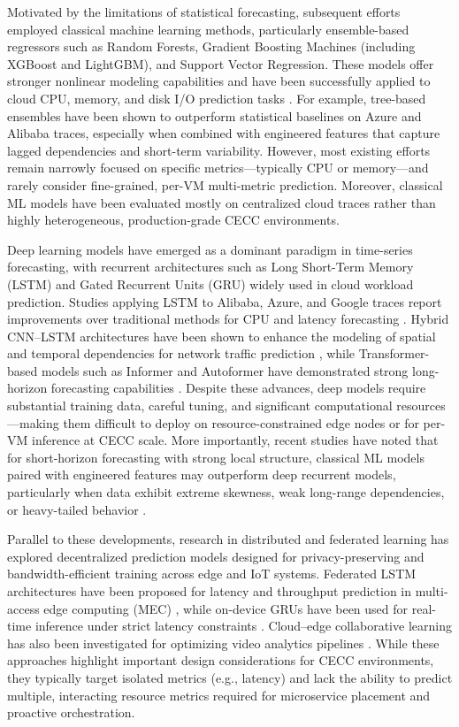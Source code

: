 \documentclass[a4paper,fleqn]{cas-dc}
\begin{document}
Motivated by the limitations of statistical forecasting, subsequent efforts employed classical machine learning methods, particularly ensemble-based regressors such as Random Forests, Gradient Boosting Machines (including XGBoost and LightGBM), and Support Vector Regression. These models offer stronger nonlinear modeling capabilities and have been successfully applied to cloud CPU, memory, and disk I/O prediction tasks \cite{b7,b8,b9}. For example, tree-based ensembles have been shown to outperform statistical baselines on Azure and Alibaba traces, especially when combined with engineered features that capture lagged dependencies and short-term variability. However, most existing efforts remain narrowly focused on specific metrics---typically CPU or memory---and rarely consider fine-grained, per-VM multi-metric prediction. Moreover, classical ML models have been evaluated mostly on centralized cloud traces rather than highly heterogeneous, production-grade CECC environments.

Deep learning models have emerged as a dominant paradigm in time-series forecasting, with recurrent architectures such as Long Short-Term Memory (LSTM) and Gated Recurrent Units (GRU) widely used in cloud workload prediction. Studies applying LSTM to Alibaba, Azure, and Google traces report improvements over traditional methods for CPU and latency forecasting \cite{b11,b12}. Hybrid CNN--LSTM architectures have been shown to enhance the modeling of spatial and temporal dependencies for network traffic prediction \cite{b14}, while Transformer-based models such as Informer and Autoformer have demonstrated strong long-horizon forecasting capabilities \cite{b15,b16}. Despite these advances, deep models require substantial training data, careful tuning, and significant computational resources---making them difficult to deploy on resource-constrained edge nodes or for per-VM inference at CECC scale. More importantly, recent studies have noted that for short-horizon forecasting with strong local structure, classical ML models paired with engineered features may outperform deep recurrent models, particularly when data exhibit extreme skewness, weak long-range dependencies, or heavy-tailed behavior \cite{b6}.

Parallel to these developments, research in distributed and federated learning has explored decentralized prediction models designed for privacy-preserving and bandwidth-efficient training across edge and IoT systems. Federated LSTM architectures have been proposed for latency and throughput prediction in multi-access edge computing (MEC) \cite{b17}, while on-device GRUs have been used for real-time inference under strict latency constraints \cite{b18}. Cloud--edge collaborative learning has also been investigated for optimizing video analytics pipelines \cite{b19}. While these approaches highlight important design considerations for CECC environments, they typically target isolated metrics (e.g., latency) and lack the ability to predict multiple, interacting resource metrics required for microservice placement and proactive orchestration.
\end{document}
